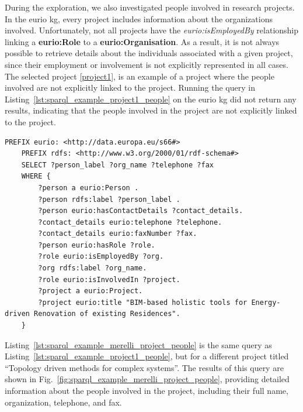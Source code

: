 During the exploration, we also investigated people involved in research projects.
In the \gls{eurio} \gls{kg}, every project includes information about the organizations involved.
Unfortunately, not all projects have the \textit{eurio:isEmployedBy} relationship linking a \textbf{eurio:Role} to a \textbf{eurio:Organisation}.
As a result, it is not always possible to retrieve details about the individuals associated with a given project, since their employment or involvement is not explicitly represented in all cases.
The selected project \ref{project1}, is an example of a project where the people involved are not explicitly linked to the project.
Running the query in Listing~\ref{lst:sparql_example_project1_people} on the \gls{eurio} \gls{kg} did not return any results, indicating that the people involved in the project are not explicitly linked to the project.

\begin{lstlisting}[language=SPARQL, caption={\gls{sparql} query for getting full name, organisation, telephone, and fax of the people involved in a project titled ``BIM-based holistic tools for Energy-driven Renovation of existing Residences''}, label=lst:sparql_example_project1_people]
    PREFIX eurio: <http://data.europa.eu/s66#>
    PREFIX rdfs: <http://www.w3.org/2000/01/rdf-schema#>
    SELECT ?person_label ?org_name ?telephone ?fax
    WHERE {
        ?person a eurio:Person .
        ?person rdfs:label ?person_label .
        ?person eurio:hasContactDetails ?contact_details.
        ?contact_details eurio:telephone ?telephone.
        ?contact_details eurio:faxNumber ?fax.
        ?person eurio:hasRole ?role.
        ?role eurio:isEmployedBy ?org.
        ?org rdfs:label ?org_name.
        ?role eurio:isInvolvedIn ?project.
        ?project a eurio:Project.
        ?project eurio:title "BIM-based holistic tools for Energy-driven Renovation of existing Residences".
    }
\end{lstlisting}

Listing~\ref{lst:sparql_example_merelli_project_people} is the same query as Listing~\ref{lst:sparql_example_project1_people}, but for a different project titled ``Topology driven methods for complex systems''.
The results of this query are shown in Fig.~\ref{fig:sparql_example_merelli_project_people}, providing detailed information about the people involved in the project, including their full name, organization, telephone, and fax.

